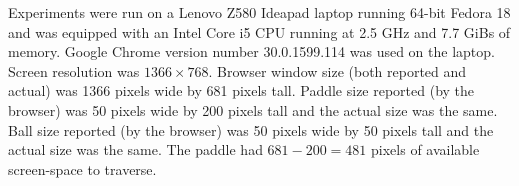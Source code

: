 \documentclass[a4paper,10pt]{article}
\begin{document}






Experiments were run on a Lenovo Z580 Ideapad laptop running 64-bit Fedora 18 and was equipped with an Intel Core i5 CPU running at 2.5 GHz and 7.7 GiBs of memory. Google Chrome version number 30.0.1599.114 was used on the laptop. Screen resolution was $1366\times768$. Browser window size (both reported and actual) was 1366 pixels wide by 681 pixels tall. Paddle size reported (by the browser) was 50 pixels wide by 200 pixels tall and the actual size was the same. Ball size reported (by the browser) was 50 pixels wide by 50 pixels tall and the actual size was the same. The paddle had $681-200=481$ pixels of available screen-space to traverse.  
\end{document}
